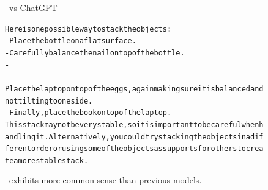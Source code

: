 \begin{figure}
\begin{AIbox}{\DV\ vs ChatGPT}
{\begin{alltt}
    Here is one possible way to stack the objects:\\
    
    - Place the bottle on a flat surface.\\
    - Carefully balance the nail on top of the bottle.\\
    - \\
    - Place the laptop on top of the eggs, again making sure it is balanced and not tilting to one side.\\
    - Finally, place the book on top of the laptop.\\
    
    This stack may not be very stable, so it is important to be careful when handling it. Alternatively, you could try stacking the objects in a different order or using some of the objects as supports for others to create a more stable stack.
    \end{alltt}}
    \end{AIbox}
    \caption{\DV\ exhibits more common sense than previous models.}\label{fig:commonsense1}
    \end{figure}
    
